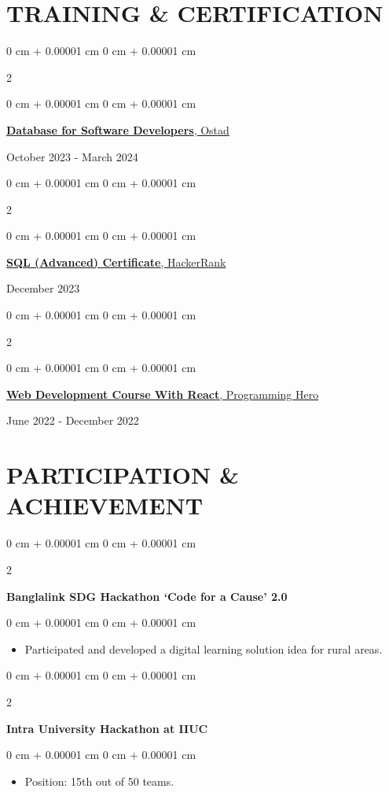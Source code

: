 \documentclass[10pt, letterpaper]{article}
\newenvironment{highlights}{
    \begin{itemize}[
        topsep=0.10 cm,
        parsep=0.10 cm,
        partopsep=0pt,
        itemsep=0pt,
        leftmargin=0 cm + 10pt
    ]
}{
    \end{itemize}
} %
\newenvironment{onecolentry}{
    \begin{adjustwidth}{
        0 cm + 0.00001 cm
    }{
        0 cm + 0.00001 cm
    }
}{
    \end{adjustwidth}
} %
\newenvironment{twocolentry}[2][]{
    \onecolentry
    \def\secondColumn{#2}
    \setcolumnwidth{\fill, 4.5 cm}
    \begin{paracol}{2}
}{
    \switchcolumn \raggedleft \secondColumn
    \end{paracol}
    \endonecolentry
} %
\begin{document}
    \vspace{0.15 cm}
    \section{TRAINING \& CERTIFICATION}
    \begin{twocolentry}{October 2023 - March 2024}
        
    
    \vspace{0.10 cm}
    \begin{onecolentry}
        \href{https://drive.google.com/file/d/1t_k2HsfITOH-yVhTBpRSHczNjdDXQhbtK/view?usp=drive_link}{
            \textbf{Database for Software Developers}, Ostad
        }
    \end{onecolentry}
    \end{twocolentry}

    \vspace{0.15 cm}
    \begin{twocolentry}{December 2023}
        
    
    \vspace{0.10 cm}
    \begin{onecolentry}
        \href{https://www.hackerrank.com/certificates/a70bc2832786}{
            \textbf{SQL (Advanced) Certificate}, HackerRank
        }
    \end{onecolentry}
    \end{twocolentry}

    \vspace{0.15 cm}
    \begin{twocolentry}{June 2022 - December 2022}
        
    \vspace{0.10 cm}
    \begin{onecolentry}
        \href{https://drive.google.com/file/d/1Nthcd9QuN2zBc2fYyQrQOFG4pT5AOMTM/view}{\textbf{Web Development Course With React}, Programming Hero}
    \end{onecolentry}
    \end{twocolentry}

    \vspace{0.15 cm}
    \section{PARTICIPATION \& ACHIEVEMENT}
    \begin{twocolentry}{2020}
        \textbf{Banglalink SDG Hackathon `Code for a Cause' 2.0}
    \end{twocolentry}
    \begin{onecolentry}
        \begin{highlights}
            \item Participated and developed a digital learning solution idea for rural areas.
        \end{highlights}
    \end{onecolentry}

    \vspace{0.15 cm}
    \begin{twocolentry}{2017}
        \textbf{Intra University Hackathon at IIUC}
    \end{twocolentry}
    \begin{onecolentry}
        \begin{highlights}
            \item Position: 15th out of 50 teams.
        \end{highlights}
    \end{onecolentry}
\end{document}
